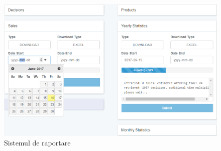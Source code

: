 		\begin{figure}
			\includegraphics[width=\linewidth]{../imagini/reports.png}
			\caption{Sistemul de raportare}
			\label{fig:reports}
		\end{figure}
